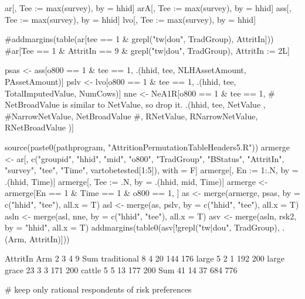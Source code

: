 \begin{Schunk}
\begin{Sinput}
ar[, Tee := max(survey), by = hhid]
arA[, Tee := max(survey), by = hhid]
ass[, Tee := max(survey), by = hhid]
lvo[, Tee := max(survey), by = hhid]
\end{Sinput}
\end{Schunk}
\begin{Schunk}
\begin{Sinput}
#addmargins(table(ar[tee == 1 & grepl("tw|dou", TradGroup), AttritIn]))
#ar[Tee == 1 & AttritIn == 9 & grepl("tw|dou", TradGroup), AttritIn := 2L]
\end{Sinput}
\end{Schunk}
\begin{Schunk}
\begin{Sinput}
psas <- ass[o800 == 1 & tee == 1, 
  .(hhid, tee, NLHAssetAmount, PAssetAmount)]
pslv <- lvo[o800 == 1 & tee == 1, 
  .(hhid, tee, TotalImputedValue, NumCows)]
nne <- NeA1R[o800 == 1 & tee == 1, 
  # NetBroadValue is similar to NetValue, so drop it.
  .(hhid, tee, NetValue , #NarrowNetValue, 
  NetBroadValue
  #, RNetValue, RNarrowNetValue, RNetBroadValue
  )]
\end{Sinput}
\end{Schunk}
\begin{Schunk}
\begin{Sinput}
source(paste0(pathprogram, "AttritionPermutationTableHeaders5.R"))
armerge <- ar[, c("groupid", "hhid", "mid", "o800", "TradGroup", 
  "BStatus", "AttritIn", "survey", "tee", "Time", vartobetested[1:5]), with = F]
armerge[, En := 1:.N, by = .(hhid, Time)]
armerge[, Tee := .N, by = .(hhid, mid, Time)]
armerge <- armerge[En == 1 & Time == 1 & o800 == 1, ]
as <- merge(armerge, psas, by = c("hhid", "tee"), all.x = T)
asl <- merge(as, pslv, by = c("hhid", "tee"), all.x = T)
asln <- merge(asl, nne, by = c("hhid", "tee"), all.x = T)
asv <- merge(asln, rsk2, by = "hhid", all.x = T)
addmargins(table0(asv[!grepl("tw|dou", TradGroup), .(Arm, AttritIn)]))
\end{Sinput}
\begin{Soutput}
             AttritIn
Arm             2   3   4   9 Sum
  traditional   8   4  20 144 176
  large         5   2   1 192 200
  large grace  23   3   3 171 200
  cattle        5   5  13 177 200
  Sum          41  14  37 684 776
\end{Soutput}
\begin{Sinput}
# keep only rational respondents of risk preferences
\end{Sinput}
\end{Schunk}
